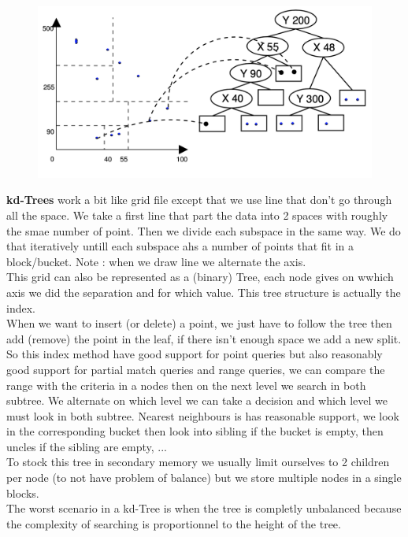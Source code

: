 \documentclass[12pt,a4paper]{article}
\begin{document}
\begin{figure}
\vspace{-9mm}
\includegraphics[scale=0.4]{img/img55.png}
\end{figure}
\textbf{kd-Trees} work a bit like grid file except that we use line that don't go through all the space. We take a first line that part the data into 2 spaces with roughly the smae number of point. Then we divide each subspace in the same way. We do that iteratively untill each subspace ahs a number of points that fit in a block/bucket. Note : when we draw line we alternate the axis.\\
This grid can also be represented as a (binary) Tree, each node gives on wwhich axis we did the separation and for which value. This tree structure is actually the index.\\
When we want to insert (or delete) a point, we just have to follow the tree then add (remove) the point in the leaf, if there isn't enough space we add a new split. So this index method have good support for point queries but also reasonably good support for partial match queries and range queries, we can compare the range with the criteria in a nodes then on the next level we search in both subtree. We alternate on which level we can take a decision and which level we must look in both subtree. Nearest neighbours is has reasonable support, we look in the corresponding bucket then look into sibling if the bucket is empty, then uncles if the sibling are empty, ...\\
To stock this tree in secondary memory we usually limit ourselves to 2 children per node (to not have problem of balance) but we store multiple nodes in a single blocks.\\
The worst scenario in a kd-Tree is when the tree is completly unbalanced because the complexity of searching is proportionnel to the height of the tree.
\end{document}
